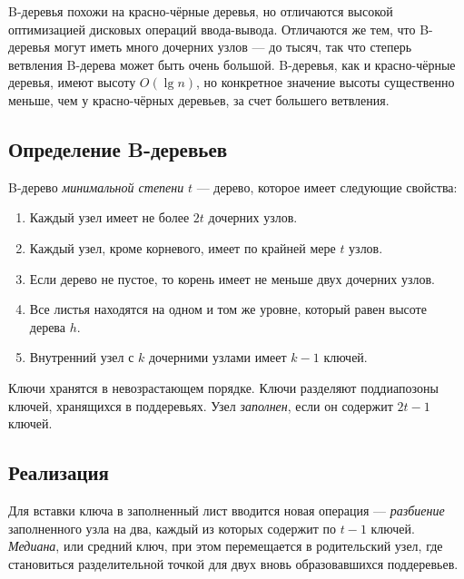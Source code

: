 B-деревья похожи на красно-чёрные деревья, но отличаются высокой оптимизацией дисковых операций ввода-вывода. Отличаются же тем, что B-деревья могут иметь много дочерних узлов — до тысяч, так что степерь ветвления B-дерева может быть очень большой. B-деревья, как и красно-чёрные деревья, имеют высоту $O(\lg n)$, но конкретное значение высоты существенно меньше, чем у красно-чёрных деревьев, за счет большего ветвления.

\subsection{Определение B-деревьев}
B-дерево \emph{минимальной степени} $t$ — дерево, которое имеет следующие свойства:
\begin{enumerate}
  \item Каждый узел имеет не более $2t$ дочерних узлов.
  \item Каждый узел, кроме корневого, имеет по крайней мере $t$ узлов.
  \item Если дерево не пустое, то корень имеет не меньше двух дочерних узлов.
  \item Все листья находятся на одном и том же уровне, который равен высоте дерева $h$.
  \item Внутренний узел с $k$ дочерними узлами имеет $k - 1$ ключей.
\end{enumerate}

Ключи хранятся в невозрастающем порядке. Ключи разделяют поддиапозоны ключей, хранящихся в поддеревьях. Узел \emph{заполнен}, если он содержит $2t - 1$ ключей.

\subsection{Реализация}
Для вставки ключа в заполненный лист вводится новая операция — \emph{разбиение} заполненного узла на два, каждый из которых содержит по $t - 1$ ключей. \emph{Медиана}, или средний ключ,  при этом перемещается в родительский узел, где становиться разделительной точкой для двух вновь образовавшихся поддеревьев.


